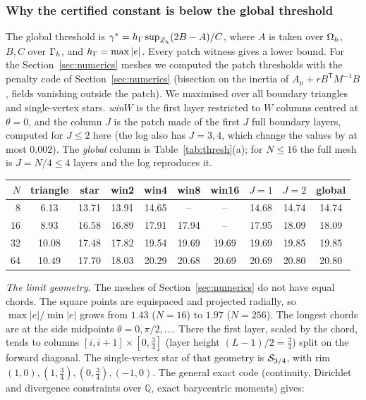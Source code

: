\subsubsection{Why the certified constant is below the global threshold}

The global threshold is $\gamma^\ast=h_\Gamma\sup_{Z_h}(2B-A)/C$, where $A$ is taken over $\Omega_h$, $B,C$ over $\Gamma_h$, and
$h_\Gamma=\max|e|$. Every patch witness gives a lower bound. For the Section~\ref{sec:numerics} meshes we computed the patch
thresholds with the penalty code of Section~\ref{sec:numerics} (bisection on the inertia of $A_\mu+rB^{\mathsf T}M^{-1}B$, fields vanishing
outside the patch). We maximised over all boundary triangles and single-vertex stars. \emph{win}$W$ is the first layer
restricted to $W$ columns centred at $\theta=0$, and the column $J$ is the patch made of the first $J$ full boundary layers, computed for $J\le2$ here (the log also has $J=3,4$, which change the values by at most $0.002$). The \emph{global} column is Table~\ref{tab:thresh}(a); for $N\le16$ the full mesh is $J=N/4\le4$ layers and the log reproduces it.

\begin{center}\small
\begin{tabular}{rccccccccc}
\toprule
$N$ & triangle & star & win2 & win4 & win8 & win16 & $J=1$ & $J=2$ & global\\
\midrule
8 & 6.13 & 13.71 & 13.91 & 14.65 & -- & -- & 14.68 & 14.74 & 14.74\\
16 & 8.93 & 16.58 & 16.89 & 17.91 & 17.94 & -- & 17.95 & 18.09 & 18.09\\
32 & 10.08 & 17.48 & 17.82 & 19.54 & 19.69 & 19.69 & 19.69 & 19.85 & 19.85\\
64 & 10.49 & 17.70 & 18.03 & 20.29 & 20.68 & 20.69 & 20.69 & 20.80 & 20.80\\
\bottomrule
\end{tabular}
\end{center}

\emph{The limit geometry.} The meshes of Section~\ref{sec:numerics} do not have equal chords. The square points are
equispaced and projected radially, so $\max|e|/\min|e|$ grows from $1.43$ ($N=16$) to $1.97$ ($N=256$). The longest chords
are at the side midpoints $\theta=0,\pi/2,\ldots$. There the first layer, scaled by the chord, tends to columns
$[i,i+1]\times[0,\frac34]$ (layer height $(L-1)/2=\frac34$) split on the forward diagonal. The single-vertex star of that
geometry is $\mathcal S_{3/4}$, with rim $(1,0),(1,\frac34),(0,\frac34),(-1,0)$. The general exact code (continuity, Dirichlet and
divergence constraints over $\mathbb Q$, exact barycentric moments) gives:

